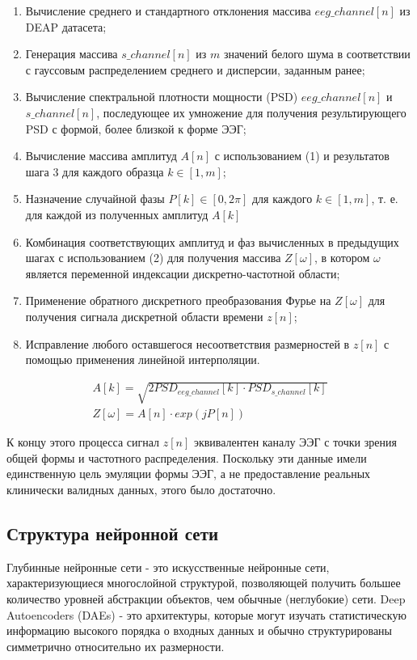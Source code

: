 \documentclass[12pt, a4paper, titlepage]{extreport}
\begin{document}
	\begin{enumerate}
		\item Вычисление среднего и стандартного отклонения массива $eeg\_channel[n]$ из DEAP датасета;
		\item Генерация массива $s\_channel[n]$ из $m$ значений белого шума в соответствии с гауссовым распределением среднего и дисперсии, заданным ранее;
		\item Вычисление спектральной плотности мощности (PSD)  $eeg\_channel[n]$ и  $s\_channel[n]$, последующее их умножение для получения результирующего PSD с формой, более близкой к форме ЭЭГ;
		\item Вычисление массива амплитуд $A[n]$ с использованием (1) и результатов шага 3 для каждого образца $k \in [1, m]$;
		\item Назначение случайной фазы $P[k] \in [0, 2\pi]$ для каждого $k \in [1, m]$, т. е. для каждой из полученных амплитуд $A[k]$
		\item Комбинация соответствующих амплитуд и фаз вычисленных в предыдущих шагах с использованием (2) для получения массива $Z[\omega]$, в котором $\omega$ является переменной индексации дискретно-частотной области;
		\item Применение обратного дискретного преобразования Фурье на $Z[\omega]$ для получения сигнала дискретной области времени $z[n]$;
		\item Исправление любого оставшегося несоответствия размерностей в $z[n]$ с помощью применения линейной интерполяции.
		\end{enumerate}
	\begin{align*}
	A[k] = \sqrt{2 PSD_{eeg\_channel}[k] \cdot PSD_{s\_channel}[k]}\\
	Z[\omega] = A[n]\cdot exp(j P[n])
	\end{align*}
	
	К концу этого процесса сигнал $z[n]$ эквивалентен каналу ЭЭГ с точки зрения общей формы и частотного распределения. Поскольку эти данные имели единственную цель эмуляции формы ЭЭГ, а не предоставление реальных клинически валидных данных, этого было достаточно.
	
	\subsection*{Структура нейронной сети}
	
	Глубинные нейронные сети - это искусственные нейронные сети, характеризующиеся многослойной структурой, позволяющей получить большее количество уровней абстракции объектов, чем обычные (неглубокие) сети. Deep Autoencoders (DAEs) - это архитектуры, которые могут изучать статистическую информацию высокого порядка о входных данных и обычно структурированы симметрично относительно их размерности.
	
\end{document}
